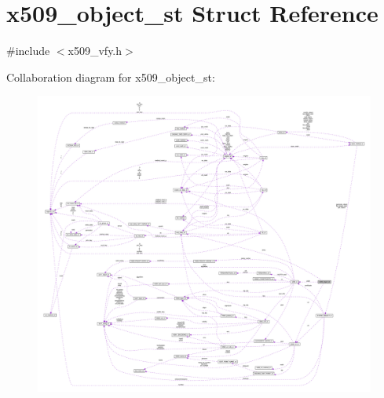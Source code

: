 \hypertarget{structx509__object__st}{}\section{x509\+\_\+object\+\_\+st Struct Reference}
\label{structx509__object__st}


{\ttfamily \#include $<$x509\+\_\+vfy.\+h$>$}



Collaboration diagram for x509\+\_\+object\+\_\+st\+:\nopagebreak
\begin{figure}[H]
\begin{center}
\leavevmode
\includegraphics[width=350pt]{structx509__object__st__coll__graph}
\end{center}
\end{figure}
